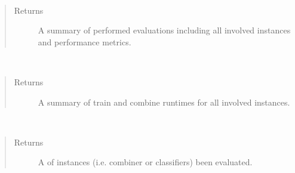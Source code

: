 \documentclass[letterpaper,10pt,english]{sphinxmanual}
\begin{document}
\begin{fulllineitems}
\begin{fulllineitems}
\end{fulllineitems}


\begin{fulllineitems}
\label{\detokenize{pusion.evaluation.evaluation:pusion.evaluation.evaluation.Evaluation.get_report}}~\begin{quote}\begin{description}
\item[{Returns}] \leavevmode
\sphinxAtStartPar
A summary  of performed evaluations including all involved instances and performance metrics.

\end{description}\end{quote}

\end{fulllineitems}


\begin{fulllineitems}
\label{\detokenize{pusion.evaluation.evaluation:pusion.evaluation.evaluation.Evaluation.get_runtime_report}}~\begin{quote}\begin{description}
\item[{Returns}] \leavevmode
\sphinxAtStartPar
A summary  of train and combine runtimes for all involved instances.

\end{description}\end{quote}

\end{fulllineitems}


\begin{fulllineitems}
\label{\detokenize{pusion.evaluation.evaluation:pusion.evaluation.evaluation.Evaluation.get_instances}}~\begin{quote}\begin{description}
\item[{Returns}] \leavevmode
\sphinxAtStartPar
A  of instances (i.e. combiner or classifiers) been evaluated.


\end{description}
\end{quote}
\end{fulllineitems}
\end{fulllineitems}
\end{document}
